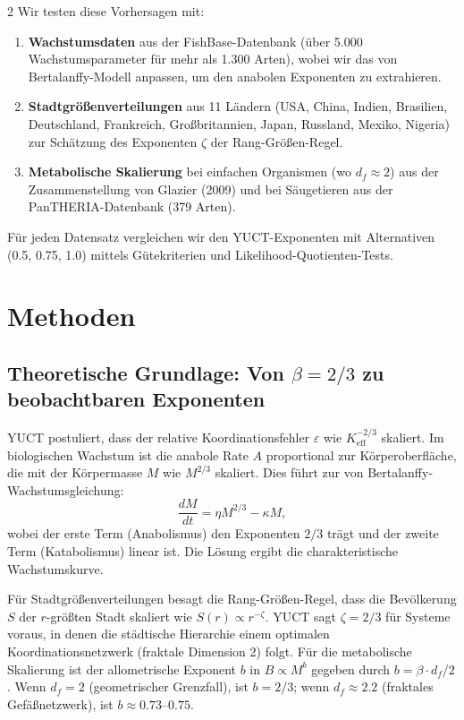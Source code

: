 \documentclass[11pt,a4paper]{article}
\newcommand{\eps}{\varepsilon}
\newcommand{\Keff}{K_{\mathrm{eff}}}
\newcommand{\betaf}{\beta}
\newcommand{\df}{d_f}
\begin{document}
\begin{multicols}{2}
		Wir testen diese Vorhersagen mit:
		\begin{enumerate}
			\item \textbf{Wachstumsdaten} aus der FishBase-Datenbank (über 5.000 Wachstumsparameter für mehr als 1.300 Arten), wobei wir das von Bertalanffy-Modell anpassen, um den anabolen Exponenten zu extrahieren.
			\item \textbf{Stadtgrößenverteilungen} aus 11 Ländern (USA, China, Indien, Brasilien, Deutschland, Frankreich, Großbritannien, Japan, Russland, Mexiko, Nigeria) zur Schätzung des Exponenten \(\zeta\) der Rang-Größen-Regel.
			\item \textbf{Metabolische Skalierung} bei einfachen Organismen (wo \(\df \approx 2\)) aus der Zusammenstellung von Glazier (2009) und bei Säugetieren aus der PanTHERIA-Datenbank (379 Arten).
		\end{enumerate}
		Für jeden Datensatz vergleichen wir den YUCT-Exponenten mit Alternativen (0.5, 0.75, 1.0) mittels Gütekriterien und Likelihood-Quotienten-Tests.
		
		\section{Methoden}
		
		\subsection{Theoretische Grundlage: Von \(\beta = 2/3\) zu beobachtbaren Exponenten}
		
		YUCT postuliert, dass der relative Koordinationsfehler \(\eps\) wie \(\Keff^{-2/3}\) skaliert. Im biologischen Wachstum ist die anabole Rate \(A\) proportional zur Körperoberfläche, die mit der Körpermasse \(M\) wie \(M^{2/3}\) skaliert. Dies führt zur von Bertalanffy-Wachstumsgleichung:
		\[
		\frac{dM}{dt} = \eta M^{2/3} - \kappa M,
		\]
		wobei der erste Term (Anabolismus) den Exponenten \(2/3\) trägt und der zweite Term (Katabolismus) linear ist. Die Lösung ergibt die charakteristische Wachstumskurve.
		
		Für Stadtgrößenverteilungen besagt die Rang-Größen-Regel, dass die Bevölkerung \(S\) der \(r\)-größten Stadt skaliert wie \(S(r) \propto r^{-\zeta}\). YUCT sagt \(\zeta = 2/3\) für Systeme voraus, in denen die städtische Hierarchie einem optimalen Koordinationsnetzwerk (fraktale Dimension 2) folgt. Für die metabolische Skalierung ist der allometrische Exponent \(b\) in \(B \propto M^{b}\) gegeben durch \(b = \betaf \cdot \df / 2\). Wenn \(\df = 2\) (geometrischer Grenzfall), ist \(b = 2/3\); wenn \(\df \approx 2.2\) (fraktales Gefäßnetzwerk), ist \(b \approx 0.73\)–\(0.75\).
		

\end{multicols}
\end{document}
